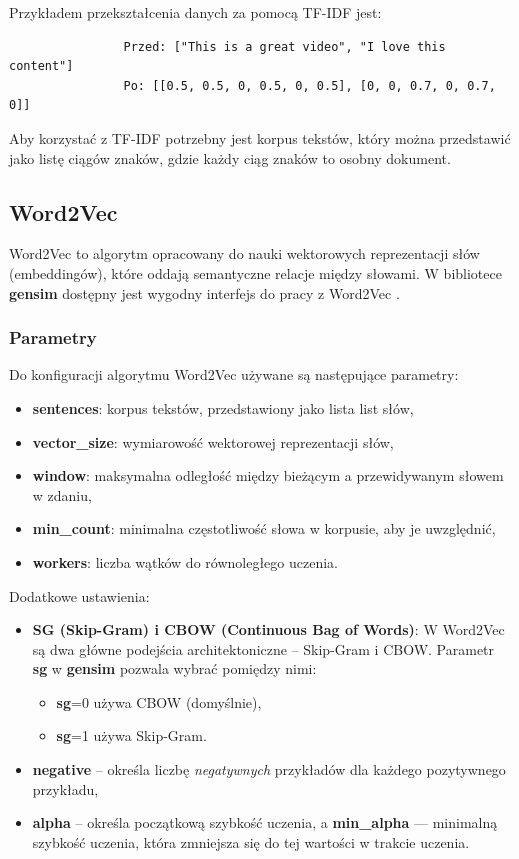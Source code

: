 			Przykładem przekształcenia danych za pomocą TF-IDF jest:
			\begin{verbatim}
				Przed: ["This is a great video", "I love this content"]
				Po: [[0.5, 0.5, 0, 0.5, 0, 0.5], [0, 0, 0.7, 0, 0.7, 0]]
			\end{verbatim}
			
			Aby korzystać z TF-IDF potrzebny jest korpus tekstów, który można przedstawić jako listę ciągów znaków, gdzie każdy ciąg znaków to osobny dokument.
			
 
	\subsection{Word2Vec}
		Word2Vec to algorytm opracowany do nauki wektorowych reprezentacji słów (embeddingów), które oddają semantyczne relacje między słowami. W bibliotece \textbf{gensim} dostępny jest wygodny interfejs do pracy z Word2Vec \cite{word2vec}.


		\subsubsection{Parametry}	
			Do konfiguracji algorytmu Word2Vec używane są następujące parametry:
			\begin{itemize}
				\item \textbf{sentences}: korpus tekstów, przedstawiony jako lista list słów,
				\item \textbf{vector\_size}: wymiarowość wektorowej reprezentacji słów,
				\item \textbf{window}: maksymalna odległość między bieżącym a przewidywanym słowem w zdaniu,
				\item \textbf{min\_count}: minimalna częstotliwość słowa w korpusie, aby je uwzględnić,
				\item \textbf{workers}: liczba wątków do równoległego uczenia.
			\end{itemize}
		
			Dodatkowe ustawienia:
			\begin{itemize}
				\item \textbf{SG (Skip-Gram) i CBOW (Continuous Bag of Words)}: W Word2Vec są dwa główne podejścia architektoniczne -- Skip-Gram i CBOW. Parametr \textbf{sg} w \textbf{gensim} pozwala wybrać pomiędzy nimi:
					\begin{itemize}
						\item \textbf{sg}=0 używa CBOW (domyślnie),
						\item \textbf{sg}=1 używa Skip-Gram.
					\end{itemize}
				\item \textbf{negative} -- określa liczbę \textit{negatywnych} przykładów dla każdego pozytywnego przykładu,
				\item \textbf{alpha} -- określa początkową szybkość uczenia, a \textbf{min\_alpha} — minimalną szybkość uczenia, która zmniejsza się do tej wartości w trakcie uczenia.
			\end{itemize}
		
